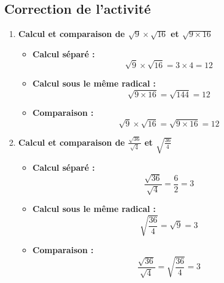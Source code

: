 \documentclass[12pt,a4paper]{article}
\begin{document}
\subsection*{\color{myred} Correction de l'activité}

\begin{enumerate}
    \item \textbf{Calcul et comparaison de $\sqrt{9} \times \sqrt{16}$ et $\sqrt{9 \times 16}$}
    \begin{itemize}
        \item \textbf{Calcul séparé :}
        $$\sqrt{9} \times \sqrt{16} = 3 \times 4 = 12$$
        
        \item \textbf{Calcul sous le même radical :}
        $$\sqrt{9 \times 16} = \sqrt{144} = 12$$
        
        \item \textbf{Comparaison :}
        $$\sqrt{9} \times \sqrt{16} = \sqrt{9 \times 16} = 12$$
    \end{itemize}
    
    \begin{quote}
    \end{quote}

    \vspace{0.3cm}

    \item \textbf{Calcul et comparaison de $\frac{\sqrt{36}}{\sqrt{4}}$ et $\sqrt{\frac{36}{4}}$}
    \begin{itemize}
        \item \textbf{Calcul séparé :}
        $$\frac{\sqrt{36}}{\sqrt{4}} = \frac{6}{2} = 3$$
        
        \item \textbf{Calcul sous le même radical :}
        $$\sqrt{\frac{36}{4}} = \sqrt{9} = 3$$
        
        \item \textbf{Comparaison :}
        $$\frac{\sqrt{36}}{\sqrt{4}} = \sqrt{\frac{36}{4}} = 3$$
    \end{itemize}
    
    \begin{quote}
    \end{quote}
\end{enumerate}
\end{document}
